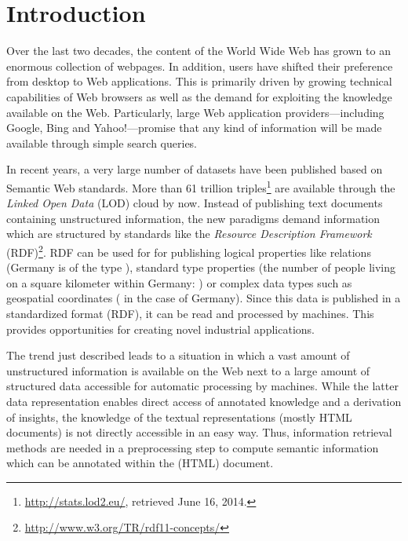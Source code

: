 

\section{Introduction}

Over the last two decades, the content of the World Wide Web has grown to an enormous collection of webpages. 
In addition, users have shifted their preference from desktop to Web applications.
This is primarily driven by growing technical capabilities of Web browsers as well as the demand for exploiting the knowledge available on the Web.
Particularly, large Web application providers---including Google, Bing and \mbox{Yahoo}!---promise that any kind of information will be made available through simple search queries. 

In recent years, a very large number of datasets have been published based on Semantic Web standards.
More than 61 trillion triples\footnote{\url{http://stats.lod2.eu/}, retrieved June 16, 2014.} are available through the \emph{Linked Open Data} (LOD) cloud by now.
Instead of publishing text documents containing unstructured information, the new paradigms demand information which are structured by standards like the \textit{Resource Description Framework} (RDF)\footnote{\url{http://www.w3.org/TR/rdf11-concepts/}}.
RDF can be used for for publishing logical properties like  relations (\eg Germany is of the type ), standard type properties (\eg the number of people living on a square kilometer within Germany: ) or complex data types such as geospatial coordinates (\eg {} in the case of Germany).
Since this data is published in a standardized format (\ie RDF), it can be read and processed by machines.
This provides opportunities for creating novel industrial applications. 

The trend just described leads to a situation in which a vast amount of unstructured information is available on the Web next to a large amount of structured data accessible for automatic processing by machines.
While the latter data representation enables direct access of annotated knowledge and a derivation of insights, the knowledge of the textual representations (mostly HTML documents) is not directly accessible in an easy way. 
Thus, information retrieval methods are needed in a preprocessing step to compute semantic information which can be annotated within the (HTML) document.

